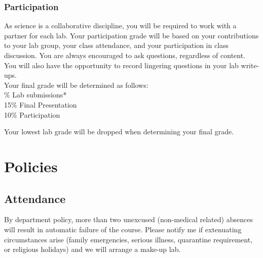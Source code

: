 \documentclass[10pt]{article}
\begin{document}
\subsubsection*{Participation}
\noindent As science is a collaborative discipline, you will be required to work with a partner for each lab. Your participation grade will be based on your contributions to your lab group, your class attendance, and your participation in class discussion. You are always encouraged to ask questions, regardless of content. You will also have the opportunity to record lingering questions in your lab write-ups.\\
 
\noindent Your final grade will be determined as follows:\\

\% Lab submissions*\\
15\% Final Presentation\\
10\% Participation 

\noindent*Your lowest lab grade will be dropped when determining your final grade.

\section*{Policies}
 
\subsection*{Attendance}
 
By department policy, more than two unexcused (non-medical related) absences will result in automatic failure of the course. Please notify me if extenuating circumstances arise (family emergencies, serious illness, quarantine requirement, or religious holidays) and we will arrange a make-up lab.
\end{document}
